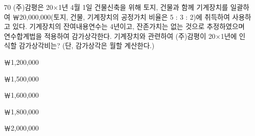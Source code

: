 \begin{question}{70}
(주)감평은 20×1년 4월 1일 건물신축을 위해 토지, 건물과 함께 기계장치를 일괄하여 ￦20,000,000(토지, 건물, 기계장치의 공정가치 비율은 5 : 3 : 2)에 취득하여 사용하고 있다. 기계장치의 잔여내용연수는 4년이고, 잔존가치는 없는 것으로 추정하였으며 연수합계법을 적용하여 감가상각한다. 기계장치와 관련하여 (주)감평이 20×1년에 인식할 감가상각비는? (단, 감가상각은 월할 계산한다.)
\begin{choices}
  \item ￦1,200,000
  \item ￦1,500,000
  \item ￦1,600,000
  \item ￦1,800,000
  \item ￦2,000,000
\end{choices}
\end{question}
